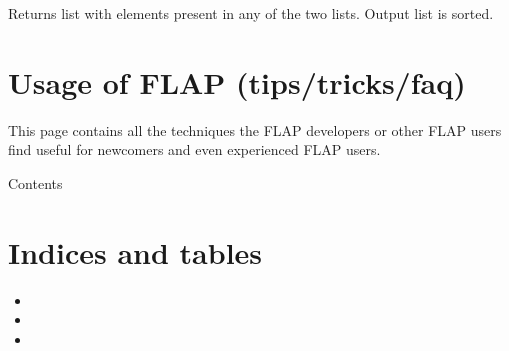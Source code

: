 \documentclass[letterpaper,10pt,english]{sphinxmanual}
\begin{document}

\begin{fulllineitems}
\label{\detokenize{tools:flap.tools.unify_list}}
Returns list with elements present in any of the two lists.
Output list is sorted.

\end{fulllineitems}



\chapter{Usage of FLAP (tips/tricks/faq)}
\label{\detokenize{usage:usage-of-flap-tips-tricks-faq}}\label{\detokenize{usage::doc}}
This page contains all the techniques the FLAP developers or other FLAP
users find useful for newcomers and even experienced FLAP users.

Contents


\chapter{Indices and tables}
\label{\detokenize{index:indices-and-tables}}\begin{itemize}
\item {} 

\item {} 

\item {} 

\end{itemize}


\renewcommand{\indexname}{Python Module Index}
\begin{sphinxtheindex}
\let\bigletter\sphinxstyleindexlettergroup
\bigletter{f}
\item\relax{}
\item\relax{}
\item\relax{}
\item\relax{}
\item\relax{}
\item\relax{}
\item\relax{}
\end{sphinxtheindex}

\renewcommand{\indexname}{Index}
\printindex
\end{document}
